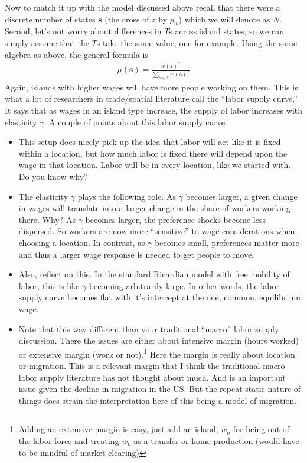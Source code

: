 \documentclass[pdftex,12pt]{article}
\begin{document}
\medskip
\noindent Now to match it up with the model discussed above recall that there were a discrete number of states $\textbf{s}$ (the cross of $z$ by $p_w$) which we will denote as $N$. Second, let's not worry about differences in $T$s across island states, so we can simply assume that the $T$s take the same value, one for example. Using the same algebra as above, the general formula is 
\begin{align}
\mu(\textbf{s}) = \frac{w(\textbf{s})^{\gamma}}{\sum_{s \in \mathcal{S}} w(\textbf{s})^{\gamma}}
\end{align}
Again, islands with higher wages will have more people working on them. This is what a lot of researchers in trade/spatial literature call the ``labor supply curve.'' It says that as wages in an island type increase, the supply of labor increases with elasticity $\gamma$. A couple of points about this labor supply curve:
\begin{itemize}
\item This setup does nicely pick up the idea that labor will act like it is fixed within a location, but how much labor is fixed there will depend upon the wage in that location. Labor will be in every location, like we started with. Do you know why?

\item The elasticity $\gamma$ plays the following role. As $\gamma$ becomes larger, a given change in wages will translate into a larger change in the share of workers working there. Why? As $\gamma$ becomes larger, the preference shocks become less dispersed. So workers are now more ``sensitive'' to wage considerations when choosing a location. In contrast, as $\gamma$ becomes small, preferences matter more and thus a larger wage response is needed to get people to move. 
    
\item Also, reflect on this. In the standard Ricardian model with free mobility of labor, this is like $\gamma$ becoming arbitrarily large. In other words, the labor supply curve becomes flat with it's intercept at the one, common, equilibrium wage.

\item  Note that this way different than your traditional ``macro'' labor supply discussion. There the issues are either about intensive margin (hours worked) or extensive margin (work or not).\footnote{Adding an extensive margin is easy, just add an island, $w_o$ for being out of the labor force and treating $w_o$ as a transfer or home production (would have to be mindful of market clearing)} Here the margin is really about location or migration. This is a relevant margin that I think the traditional macro labor supply literature has not thought about much. And is an important issue given the decline in migration in the US. But the repeat static nature of things does strain the interpretation here of this being a model of migration.
\end{itemize}
\end{document}
